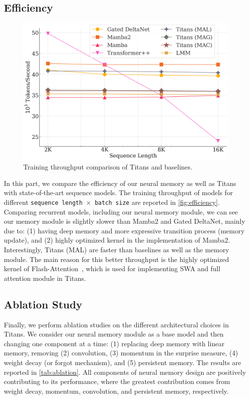 \subsection{Efficiency}\label{sec:exp-efficiency}
\begin{figure}
    \centering
    \vspace{-3ex}
        \includegraphics[width=\linewidth]{Figures/efficiency.png}
    \caption{Training throughput comparison of Titans and baselines. }
    \label{fig:efficiency}
    \vspace{-6ex}
\end{figure}
In this part, we compare the efficiency of our neural memory as well as Titans with state-of-the-art sequence models. The training throughput of models for different \texttt{sequence length $\times$ batch size} are reported in \autoref{fig:efficiency}. Comparing recurrent models, including our neural memory module, we can see our memory module is slightly slower than Mamba2 and Gated DeltaNet, mainly due to: (1) having deep memory and more expressive
transition process (memory update), and (2) highly optimized kernel in the implementation of Mamba2. Interestingly, Titans (MAL) are faster than baselines as well as the memory module. The main reason for this better throughput is the highly optimized kernel of Flash-Attention~\citep{dao2024flashattention}, which is used for implementing SWA and full attention module in Titans.  



\subsection{Ablation Study}\label{sec:exp-ablation}
Finally, we perform ablation studies on the different architectural choices in Titans. We consider our neural memory module as a base model and then changing one component at a time: (1) replacing deep memory with linear memory, removing (2) convolution, (3) momentum in the surprise measure, (4) weight decay (or forgot mechanism), and (5) persistent memory. The results are reported in \autoref{tab:ablation}. All components of neural memory design are positively contributing to its performance, where the greatest contribution comes from weight decay, momentum, convolution, and persistent memory, respectively. 




